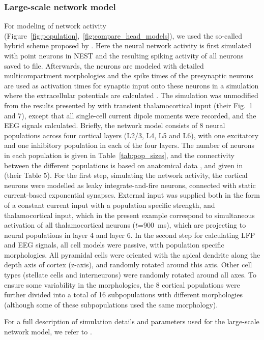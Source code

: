 \documentclass[preprint,10pt,authoryear]{elsarticle}
\newcommand{\newtxt}[1]{{\color{Red}#1}}
\begin{document}
\subsubsection{\newtxt{Large-scale network model}}
\newtxt{
For modeling of network activity (Figure~\ref{fig:population},~\ref{fig:compare_head_models}), we used the so-called hybrid scheme proposed by \cite{HAGEN2016}. Here the neural network activity is first simulated with point neurons in NEST \citep{NEST} and the resulting spiking activity of all neurons saved to file. Afterwards, the neurons are modeled with detailed multicompartment morphologies and the spike times of the presynaptic neurons are used as activation times for synaptic input onto these neurons in a simulation where the extracellular potentials are calculated \citep{HAGEN2016, SENK2018}.
The simulation was unmodified from the results presented by \cite{HAGEN2016} with transient thalamocortical input (their Fig.~1 and 7), except that all single-cell current dipole moments were recorded, and the EEG signals calculated.
Briefly, the network model consists of 8 neural populations across four cortical layers (L2/3, L4, L5 and L6), with one excitatory and one inhibitory population in each of the four layers. The number of neurons in each population is given in Table~\ref{tab:pop_sizes}, and the connectivity between the different populations is based on anatomical data \citep{Binzegger2004, POTJANS2014}, and given in \cite{HAGEN2016} (their Table 5). For the first step, simulating the network activity, the cortical neurons were modelled as leaky integrate-and-fire neurons, connected with static current-based exponential synapses. External input was supplied both in the form of a constant current input with a population specific strength, and thalamocortical input, which in the present example correspond to simultaneous activation of all thalamocortical neurons ($t$=900~ms), which are projecting to neural populations in layer 4 and layer 6.
In the second step for calculating LFP and EEG signals, all cell models were passive, with population specific morphologies. 
All pyramidal cells were oriented with the apical dendrite along the depth axis of cortex (z-axis), and randomly rotated around this axis. Other cell types (stellate cells and interneurons) were randomly rotated around all axes.
To ensure some variability in the morphologies, the 8 cortical populations were further divided into a total of 16 subpopulations with different morphologies (although some of these subpopulations used the same morphology). 

For a full description of simulation details and parameters used for the large-scale network model, we refer to \cite{HAGEN2016}. 
}
\end{document}
